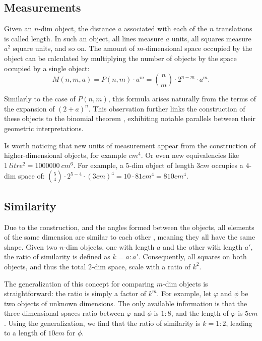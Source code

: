 \documentclass{article}
\begin{document}
	\subsection{Measurements}
	
	Given an $n$-dim object, the distance $a$ associated with each of the $n$ translations is called length. In such an object, all lines measure $a$ units, all squares measure $a^{2}$ square units, and so on. The amount of $m$-dimensional space occupied by the object can be calculated by multiplying the number of objects by the space occupied by a single object:
	$$M(n,m,a) = P(n,m) \cdot a^{m} = \binom{n}{m} \cdot 2^{n-m} \cdot a^{m}.$$
	
	Similarly to the case of $P(n,m)$, this formula arises naturally from the terms of the expansion of $(2 + a)^{n}$. This observation further links the construction of these objects to the binomial theorem \cite{rice2007}, exhibiting notable parallels between their geometric interpretations.
	
	Is worth noticing that new units of measurement appear from the construction of higher-dimensional objects, for example $cm^{4}$. Or even new equivalencies like $1\ litre^{2} = 1000000\ cm^{6}$. For example, a $5$-dim object of length $3cm$ occupies a $4$-dim space of: $\binom{5}{4} \cdot 2^{5-4} \cdot (3cm)^{4} = 10 \cdot  81 cm^{4} = 810 cm^{4}$.
	
	\subsection{Similarity}
	
	Due to the construction, and the angles formed between the objects, all elements of the same dimension are similar to each other \cite{euclid}, meaning they all have the same shape. Given two $n$-dim objects, one with length $a$ and the other with length $a'$, the ratio of similarity \cite{euclid} is defined as $k = a:a'$. Consequently, all squares on both objects, and thus the total $2$-dim space, scale with a ratio of $k^{2}$.
	
	The generalization of this concept for comparing $m$-dim objects is straightforward: the ratio is simply a factor of $k^m$. For example, let $\varphi$ and $\phi$ be two objects of unknown dimensions. The only available information is that the three-dimensional spaces ratio between $\varphi$ and $\phi$ is $1:8$, and the length of $\varphi$ is $5cm$. Using the generalization, we find that the ratio of similarity is $k = 1:2$, leading to a length of $10cm$ for $\phi$.
	
\end{document}
